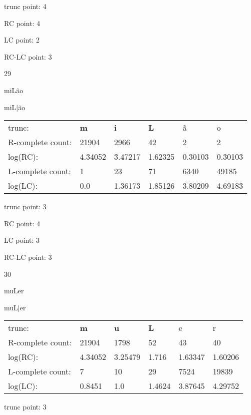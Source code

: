 \documentclass{article}
\begin{document}
trunc point: 4

RC point: 4

LC point: 2

RC-LC point: 3

\vspace{3em}



29

miLão

miL$|$ão

\vspace{1em}

\begin{tabular}{l|lllll}

trunc: & {\color{red}\bf m} & {\color{red}\bf i} & {\color{red}\bf L} & ã & o \\ 
R-complete count: & 21904 & 2966 & 42 & 2 & 2 \\ 
log(RC): & 4.34052 & 3.47217 & 1.62325 & 0.30103 & 0.30103 \\ 
L-complete count: & 1 & 23 & 71 & 6340 & 49185 \\ 
log(LC): & 0.0 & 1.36173 & 1.85126 & 3.80209 & 4.69183 \\ 
\end{tabular}

trunc point: 3

RC point: 4

LC point: 3

RC-LC point: 3

\vspace{3em}



30

muLer

muL$|$er

\vspace{1em}

\begin{tabular}{l|lllll}

trunc: & {\color{red}\bf m} & {\color{red}\bf u} & {\color{red}\bf L} & e & r \\ 
R-complete count: & 21904 & 1798 & 52 & 43 & 40 \\ 
log(RC): & 4.34052 & 3.25479 & 1.716 & 1.63347 & 1.60206 \\ 
L-complete count: & 7 & 10 & 29 & 7524 & 19839 \\ 
log(LC): & 0.8451 & 1.0 & 1.4624 & 3.87645 & 4.29752 \\ 
\end{tabular}

trunc point: 3
\end{document}
